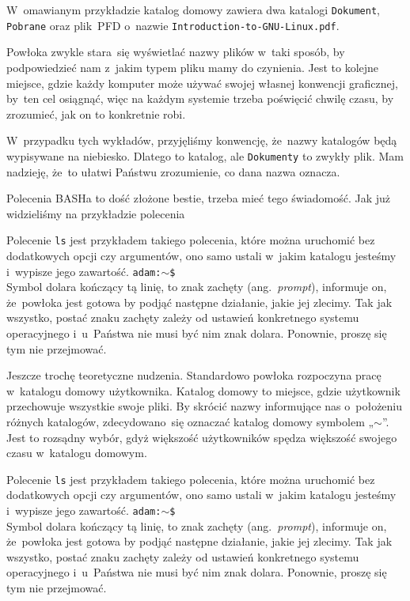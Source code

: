 \documentclass[10pt,t]{beamer}
\begin{document}
\begin{frame}
  W~omawianym przykładzie katalog domowy zawiera dwa katalogi
  \texttt{Dokument}, \texttt{Pobrane} oraz plik~PFD o~nazwie
  \texttt{Introduction-to-GNU-Linux.pdf}.

  Powłoka zwykle stara~się wyświetlać nazwy plików w~taki sposób, by
  podpowiedzieć nam z~jakim typem pliku mamy do czynienia. Jest to kolejne
  miejsce, gdzie każdy komputer może używać swojej własnej konwencji
  graficznej, by~ten cel osiągnąć, więc na każdym systemie trzeba poświęcić
  chwilę czasu, by zrozumieć, jak on to konkretnie robi.

  W~przypadku tych wykładów, przyjęliśmy konwencję, że~nazwy katalogów
  będą wypisywane na niebiesko. Dlatego \texttt{}
  to katalog, ale \texttt{Dokumenty} to zwykły plik. Mam nadzieję, że~to
  ułatwi Państwu zrozumienie, co dana nazwa oznacza.

    Polecenia BASHa to dość złożone bestie, trzeba mieć tego świadomość.
  Jak już widzieliśmy na przykładzie polecenia

  Polecenie \texttt{ls} jest przykładem takiego polecenia, które można
  uruchomić bez dodatkowych opcji czy argumentów, ono samo ustali w~jakim
  katalogu jesteśmy i~wypisze jego zawartość.
  \texttt{adam:$\sim$\$} \\
  Symbol dolara kończący tą linię, to znak zachęty (ang.~\textit{prompt}),
  informuje on, że~powłoka jest gotowa by podjąć następne działanie, jakie
  jej zlecimy. Tak jak wszystko, postać znaku zachęty zależy od ustawień
  konkretnego systemu operacyjnego i~u~Państwa nie musi być nim znak dolara.
  Ponownie, proszę się tym nie przejmować.

  Jeszcze trochę teoretyczne nudzenia. Standardowo powłoka rozpoczyna pracę
  w~katalogu domowy użytkownika. Katalog domowy to miejsce, gdzie użytkownik
  przechowuje wszystkie swoje pliki. By skrócić nazwy informujące nas
  o~położeniu różnych katalogów, zdecydowano~się oznaczać katalog domowy
  symbolem „$\sim$”. Jest to rozsądny wybór, gdyż większość użytkowników
  spędza większość swojego czasu w~katalogu domowym.

  Polecenie \texttt{ls} jest przykładem takiego polecenia, które można
  uruchomić bez dodatkowych opcji czy argumentów, ono samo ustali w~jakim
  katalogu jesteśmy i~wypisze jego zawartość.
  \texttt{adam:$\sim$\$} \\
  Symbol dolara kończący tą linię, to znak zachęty (ang.~\textit{prompt}),
  informuje on, że~powłoka jest gotowa by podjąć następne działanie, jakie
  jej zlecimy. Tak jak wszystko, postać znaku zachęty zależy od ustawień
  konkretnego systemu operacyjnego i~u~Państwa nie musi być nim znak dolara.
  Ponownie, proszę się tym nie przejmować.


\end{frame}
\end{document}
